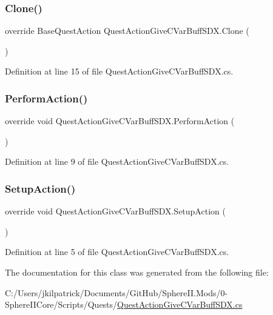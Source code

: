 \subsubsection{\texorpdfstring{Clone()}{Clone()}}
{\footnotesize\ttfamily override Base\+Quest\+Action Quest\+Action\+Give\+C\+Var\+Buff\+S\+D\+X.\+Clone (\begin{DoxyParamCaption}{ }\end{DoxyParamCaption})}



Definition at line 15 of file Quest\+Action\+Give\+C\+Var\+Buff\+S\+D\+X.\+cs.

\mbox{\label{class_quest_action_give_c_var_buff_s_d_x_a3ec449161980f4e59b59ace54d45a3a3}} 
\subsubsection{\texorpdfstring{PerformAction()}{PerformAction()}}
{\footnotesize\ttfamily override void Quest\+Action\+Give\+C\+Var\+Buff\+S\+D\+X.\+Perform\+Action (\begin{DoxyParamCaption}{ }\end{DoxyParamCaption})}



Definition at line 9 of file Quest\+Action\+Give\+C\+Var\+Buff\+S\+D\+X.\+cs.

\mbox{\label{class_quest_action_give_c_var_buff_s_d_x_a90630f27779caea686e2e3b00a8351d4}} 
\subsubsection{\texorpdfstring{SetupAction()}{SetupAction()}}
{\footnotesize\ttfamily override void Quest\+Action\+Give\+C\+Var\+Buff\+S\+D\+X.\+Setup\+Action (\begin{DoxyParamCaption}{ }\end{DoxyParamCaption})}



Definition at line 5 of file Quest\+Action\+Give\+C\+Var\+Buff\+S\+D\+X.\+cs.



The documentation for this class was generated from the following file\+:\begin{DoxyCompactItemize}
\item 
C\+:/\+Users/jkilpatrick/\+Documents/\+Git\+Hub/\+Sphere\+I\+I.\+Mods/0-\/\+Sphere\+I\+I\+Core/\+Scripts/\+Quests/\mbox{\hyperlink{_quest_action_give_c_var_buff_s_d_x_8cs}{Quest\+Action\+Give\+C\+Var\+Buff\+S\+D\+X.\+cs}}\end{DoxyCompactItemize}
